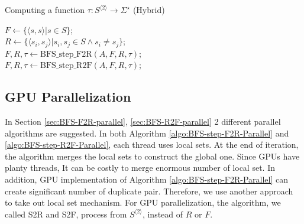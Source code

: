 \documentclass[12pt]{article}
\newcommand{\comment}[2]{{\color{red}{\bf (#1: #2)}}}
\begin{document}
\begin{algorithm}[ht]
	\label{algo:BFS-Hybrid}
	\caption{Computing a function $\tau : S^{\langle 2 \rangle} \rightarrow \Sigma^\star$ (Hybrid)}
	
	
	
	$F \longleftarrow \{ \langle s,s\rangle | s \in S \}$;\\
	$R \longleftarrow \{ \langle s_i,s_j\rangle | s_i,s_j \in S \wedge s_i \neq s_j \}$;\\
	{
		{
			$F,R,\tau \longleftarrow \mbox{BFS\_step\_F2R}(A,F,R,\tau)$;\\
		}
		\Else
		{
			$F,R,\tau \longleftarrow \mbox{BFS\_step\_R2F}(A,F,R,\tau)$;\\
		}
	}
\end{algorithm}

\subsection{GPU Parallelization}
\label{sec:BFS-GPU}
\comment{sertac}{intro olarak GPU mimariden burada mi bahsetmeli?}
In Section \ref{sec:BFS-F2R-parallel}, \ref{sec:BFS-R2F-parallel} 2 different parallel algorithms are suggested. In both Algorithm \ref{algo:BFS-step-F2R-Parallel} and \ref{algo:BFS-step-R2F-Parallel}, each thread uses local sets. At the end of iteration, the algorithm merges the local sets to construct the global one. Since GPUs have planty threads, It can be costly to merge enormous number of local set. In addition, GPU implementation of Algorithm \ref{algo:BFS-step-F2R-Parallel} can create significant number of duplicate pair. Therefore, we use another approach to take out local set mechanism. \comment{sertac}{bu konuda birilerine cite etmek gerekebilir. Daha once benzer isi yapmis olan paperlar konulabilir. Paper bulmam lazim.} For GPU parallelization, the algorithm, we called S2R and S2F, process from $S^{\langle 2 \rangle}$, instead of $R$ or $F$.
\end{document}

